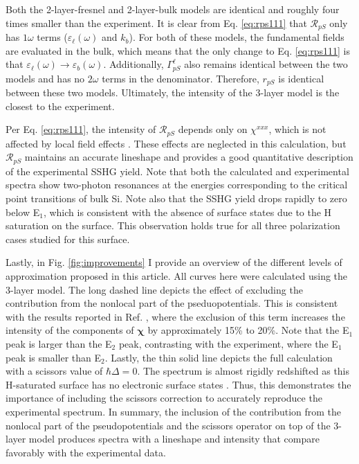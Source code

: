 Both the 2-layer-fresnel and 2-layer-bulk models are identical and roughly four
times smaller than the experiment. It is clear from Eq. \eqref{eq:rps111} that
$\mathcal{R}_{pS}$ only has $1\omega$ terms ($\varepsilon_{\ell}(\omega)$ and
$k_{b}$). For both of these models, the fundamental fields are evaluated in the
bulk, which means that the only change to Eq. \eqref{eq:rps111} is that
$\varepsilon_{\ell}(\omega) \rightarrow \varepsilon_{b}(\omega)$. Additionally,
$\Gamma^{\ell}_{pS}$ also remains identical between the two models and has no
$2\omega$ terms in the denominator. Therefore, $r_{pS}$ is identical between
these two models. Ultimately, the intensity of the 3-layer model is the closest
to the experiment.

Per Eq. \eqref{eq:rps111}, the intensity of $\mathcal{R}_{pS}$ depends only on
$\chi^{xxx}$, which is not affected by local field effects
\cite{tancognedejean:tel-01235611}. These effects are neglected in this
calculation, but $\mathcal{R}_{pS}$ maintains an accurate lineshape and provides
a good quantitative description of the experimental SSHG yield. Note that both
the calculated and experimental spectra show two-photon resonances at the
energies corresponding to the critical point transitions of bulk Si. Note also
that the SSHG yield drops rapidly to zero below E$_{1}$, which is consistent
with the absence of surface states due to the H saturation on the surface. This
observation holds true for all three polarization cases studied for this
surface.

Lastly, in Fig. \ref{fig:improvements} I provide an overview of the different
levels of approximation proposed in this article. All curves here were
calculated using the 3-layer model. The long dashed line depicts the effect of
excluding the contribution from the nonlocal part of the pseduopotentials. This
is consistent with the results reported in Ref. \cite{andersonPRB15}, where the
exclusion of this term increases the intensity of the components of
$\boldsymbol{\chi}$ by approximately 15\% to 20\%. Note
that the E$_{1}$ peak is larger than the E$_{2}$ peak, contrasting with the
experiment, where the E$_{1}$ peak is smaller than E$_{2}$. Lastly, the thin
solid line depicts the full calculation with a scissors value of $\hbar\Delta =
0$. The spectrum is almost rigidly redshifted as this H-saturated surface has no
electronic surface states \cite{andersonPRB15}. Thus, this demonstrates the
importance of including the scissors correction to accurately reproduce the
experimental spectrum. In summary, the inclusion of the contribution from the
nonlocal part of the pseudopotentials and the scissors operator on top of the
3-layer model produces spectra with a lineshape and intensity that compare
favorably with the experimental data.

